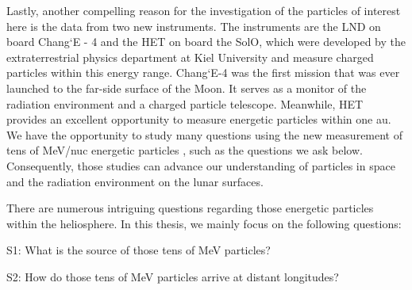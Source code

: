 Lastly, another compelling reason for the investigation of the particles of interest here is the data from two new instruments. The instruments are the \ac{LND} on board Chang`E - 4 and the \ac{HET} on board the \ac{SolO}, which were developed by the extraterrestrial physics department at Kiel University and measure charged particles within this energy range. Chang`E-4 was the first mission that was ever launched to the far-side surface of the Moon. It serves as a monitor of the radiation environment and a charged particle telescope. Meanwhile, \ac{HET} provides an excellent opportunity to measure energetic particles within one au. We have the opportunity to study many questions using the new measurement of tens of MeV/nuc energetic particles \citep{Wimmer2020SSRv,RodriguezPacheco-2019-EPD}, such as the questions we ask below.
Consequently, those studies can advance our understanding of particles in space and the radiation environment on the lunar surfaces.



There are numerous intriguing questions regarding those energetic particles within the heliosphere. In this thesis, we mainly focus on the following questions:


\begin{tcolorbox}[colback=blue!5!white,colframe=blue!75!black,title=Scientific questions - \acp{SEP}]
    S1: What is the source of those tens of MeV particles?  \\
    \hfill

    S2: How do those tens of MeV particles arrive at distant longitudes?
    
\end{tcolorbox}
    

